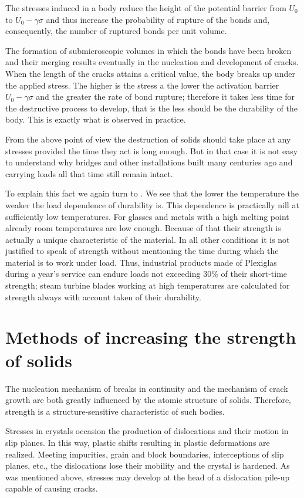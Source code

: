 The stresses induced in a body reduce the height of the potential barrier from $U_0$ to $U_0-\gamma\sigma$ and thus increase the probability of rupture of the bonds and, consequently, the number of ruptured bonds per unit volume.

The formation of submicroscopic volumes in which the bonds have been broken and their merging results eventually in the nucleation and development of cracks. When the length of the cracks attains a critical value, the body breaks up under the applied stress. The higher is the stress a the lower the activation barrier $U_0-\gamma\sigma$ and the greater the rate of bond rupture; therefore it takes less time for the destructive process to develop, that is the less should be the durability
of the body. This is exactly what is observed in practice.

From the above point of view the destruction of solids should take place at any stresses provided the time they act is long enough. But in that case it is not easy to understand why bridges and other installations built many centuries ago and carrying loads all that time still remain intact.

To explain this fact we again turn to . We see that the lower the temperature the weaker the load dependence of durability is. This dependence is practically nill at sufficiently low temperatures. For glasses and metals with a high melting point already room temperatures are low enough. Because of that their strength is actually a unique characteristic of the material. In all other conditions it is not justified to speak of strength without mentioning the time during which the material is to work under load. Thus, industrial products made of Plexiglas during a year's service can endure loads not exceeding $30\%$ of their short-time strength; steam turbine blades working at high temperatures are calculated for strength always with account taken of their durability.

\section{Methods of increasing the strength of solids}\label{sec:22}

The nucleation mechanism of breaks in continuity and the mechanism of crack growth are both greatly influenced by the atomic structure of solids. Therefore, strength is a structure-sensitive characteristic of such bodies.

Stresses in crystals occasion the production of dislocations and their motion in slip planes. In this way, plastic shifts resulting in plastic deformations are realized. Meeting impurities, grain and block boundaries, interceptions of slip planes, etc., the dislocations lose their mobility and the crystal is hardened. As was mentioned above, stresses may develop at the head of a dislocation pile-up capable of causing cracks.

